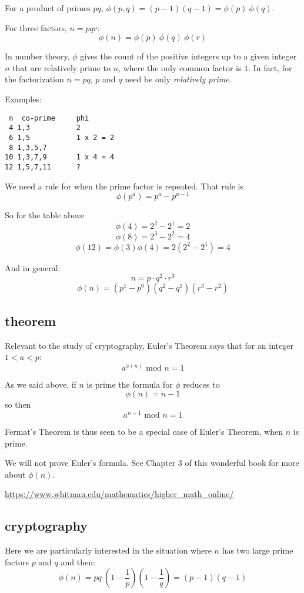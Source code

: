 \documentclass[11pt, oneside]{article}
\begin{document}
For a product of primes $pq$, $\phi(p,q) = (p-1)(q-1) = \phi(p) \ \phi(q)$.  

For three factors, $n = pqr$:
\[ \phi(n) = \phi(p) \ \phi(q) \ \phi(r) \]

In number theory, $\phi$ gives the count of the positive integers up to a given integer $n$ that are relatively prime to $n$, where the only common factor is $1$.  In fact, for the factorization $n=pq$, $p$ and $q$ need be only \emph{relatively prime}.

Examples:
\begin{verbatim}
 n  co-prime     phi
 4 1,3           2
 6 1,5           1 x 2 = 2
 8 1,3,5,7
10 1,3,7,9       1 x 4 = 4
12 1,5,7,11      ? 
\end{verbatim}

We need a rule for when the prime factor is repeated.  That rule is
\[ \phi(p^a) = p^a - p^{a-1} \]

So for the table above 
\[ \phi(4) = 2^2 - 2^1 = 2 \]
\[ \phi(8) = 2^3 - 2^2 = 4 \]
\[ \phi(12) = \phi(3) \phi(4) = 2(2^2 - 2^1) = 4 \]

And in general:
\[ n = p \cdot q^2 \cdot r^3 \]
\[ \phi(n) = (p^1 - p^0)(q^2 - q^1)(r^3 - r^2) \]

\subsection*{theorem}
Relevant to the study of cryptography, Euler's Theorem says that for an integer $1 < a < p$:
\[ a^{\phi(n)} \text{ mod } n = 1 \]

As we said above, if $n$ is prime the formula for $\phi$ reduces to 
\[ \phi(n) = n - 1 \]
so then
\[ a^{n-1} \text{ mod } n = 1 \]

Fermat's Theorem is thus seen to be a special case of Euler's Theorem, when $n$ is prime.

We will not prove Euler's formula.  See Chapter 3 of this wonderful book for more about $\phi(n)$.

\large
\url{https://www.whitman.edu/mathematics/higher_math_online/}
\Large

\subsection*{cryptography}
Here we are particularly interested in the situation where $n$ has two large prime factors $p$ and $q$ and then:
\[ \phi(n) = pq \ (1 - \frac{1}{p}) (1 - \frac{1}{q}) = (p - 1)(q - 1)  \]
\end{document}
